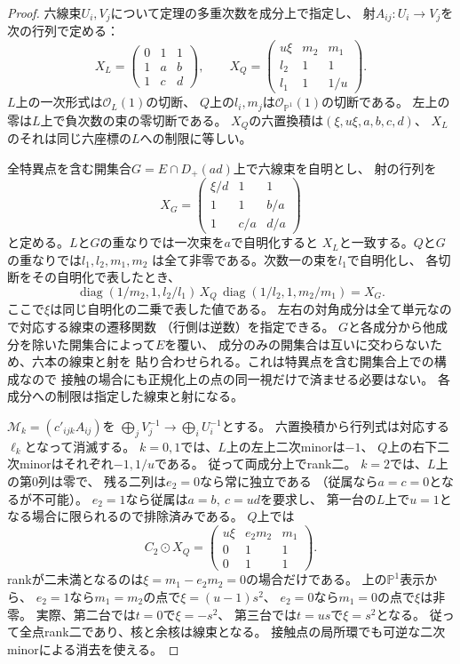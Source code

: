 \begin{proof}
六線束$U_i,V_j$について定理の多重次数を成分上で指定し、
射$A_{ij}:U_i\to V_j$を次の行列で定める：
\[
 X_L=\begin{pmatrix}0&1&1\\1&a&b\\1&c&d\end{pmatrix},
 \qquad
 X_Q=\begin{pmatrix}u\xi&m_2&m_1\\ l_2&1&1\\l_1&1&1/u\end{pmatrix}.
\]
$L$上の一次形式は$\mathcal O_L(1)$の切断、
$Q$上の$l_i,m_j$は$\mathcal O_{\mathbb P^1}(1)$の切断である。
左上の零は$L$上で負次数の束の零切断である。
$X_Q$の六置換積は$(\xi,u\xi,a,b,c,d)$、
$X_L$のそれは同じ六座標の$L$への制限に等しい。

全特異点を含む開集合$G=E\cap D_+(ad)$上で六線束を自明とし、
射の行列を
\[
 X_G=\begin{pmatrix}\xi/d&1&1\\1&1&b/a\\1&c/a&d/a\end{pmatrix}
\]
と定める。$L$と$G$の重なりでは一次束を$a$で自明化すると
$X_L$と一致する。$Q$と$G$の重なりでは$l_1,l_2,m_1,m_2$
は全て非零である。次数一の束を$l_1$で自明化し、
各切断をその自明化で表したとき、
\[
 \operatorname{diag}(1/m_2,1,l_2/l_1)\,X_Q\,
 \operatorname{diag}(1/l_2,1,m_2/m_1)=X_G .
\]
ここで$\xi$は同じ自明化の二乗で表した値である。
左右の対角成分は全て単元なので対応する線束の遷移関数
（行側は逆数）を指定できる。
$G$と各成分から他成分を除いた開集合によって$E$を覆い、
成分のみの開集合は互いに交わらないため、六本の線束と射を
貼り合わせられる。これは特異点を含む開集合上での構成なので
接触の場合にも正規化上の点の同一視だけで済ませる必要はない。
各成分への制限は指定した線束と射になる。

$\mathscr M_k=(c'_{ijk}A_{ij})$を
$\bigoplus_j V_j^{-1}\to\bigoplus_i U_i^{-1}$とする。
六置換積から行列式は対応する$\ell_k$となって消滅する。
$k=0,1$では、$L$上の左上二次minorは$-1$、
$Q$上の右下二次minorはそれぞれ$-1,1/u$である。
従って両成分上でrank二。
$k=2$では、$L$上の第0列は零で、
残る二列は$e_2=0$なら常に独立である
（従属なら$a=c=0$となるが不可能）。
$e_2=1$なら従属は$a=b,\ c=ud$を要求し、
第一台の$L$上で$u=1$となる場合に限られるので排除済みである。
$Q$上では
\[
 C_2\odot X_Q=
 \begin{pmatrix}u\xi&e_2m_2&m_1\\0&1&1\\0&1&1\end{pmatrix}.
\]
rankが二未満となるのは$\xi=m_1-e_2m_2=0$の場合だけである。
上の$\mathbb P^1$表示から、
$e_2=1$なら$m_1=m_2$の点で$\xi=(u-1)s^2$、
$e_2=0$なら$m_1=0$の点で$\xi$は非零。
実際、第二台では$t=0$で$\xi=-s^2$、
第三台では$t=us$で$\xi=s^2$となる。
従って全点rank二であり、核と余核は線束となる。
接触点の局所環でも可逆な二次minorによる消去を使える。


\end{proof}
